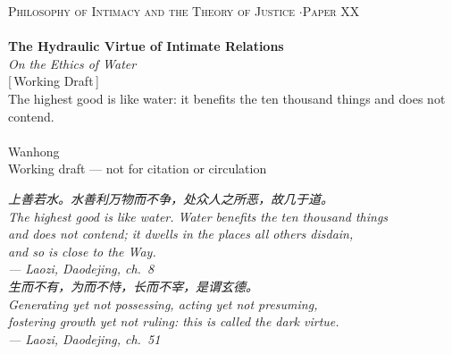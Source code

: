 \documentclass[11pt,a4paper]{article}
\begin{document}
\thispagestyle{empty}
\begin{center}
\vspace*{2cm}
{\footnotesize\color{rosedeep}\scshape Philosophy of Intimacy and the Theory of Justice \quad$\cdot$\quad Paper XX}\\[0.3cm]
\coverrule\\[1.2cm]
{\LARGE\bfseries\color{warnred} The Hydraulic Virtue of Intimate Relations}\\[0.5cm]
{\large\itshape\color{warnred} On the Ethics of Water}\\[0.8cm]
{\small\color{gold} [\,Working Draft\,]}\\[0.8cm]
{\normalsize\color{inksoft} The highest good is like water: it benefits the ten thousand things and does not contend.}\\[2cm]
\coverrule[0.25]\\[0.6cm]
{\normalsize\color{inksoft} Wanhong}\\
\vfill
{\footnotesize\color{gold} Working draft --- not for citation or circulation}
\coverfootnote
\end{center}
\newpage

\thispagestyle{empty}
\vspace*{2.2cm}
\begin{center}
\begin{minipage}{0.76\linewidth}
\centering\itshape\color{rose}
{\cjk 上善若水。水善利万物而不争，处众人之所恶，故几于道。}\\[0.3em]
The highest good is like water. Water benefits the ten thousand things\\[0.15em]
and does not contend; it dwells in the places all others disdain,\\[0.15em]
and so is close to the Way.\\[0.6em]
{\upshape\footnotesize\color{gold} --- Laozi, \emph{Daodejing}, ch.~8}\\[1.4em]
\itshape
{\cjk 生而不有，为而不恃，长而不宰，是谓玄德。}\\[0.3em]
Generating yet not possessing, acting yet not presuming,\\[0.15em]
fostering growth yet not ruling: this is called the dark virtue.\\[0.6em]
{\upshape\footnotesize\color{gold} --- Laozi, \emph{Daodejing}, ch.~51}
\end{minipage}
\end{center}
\newpage
\end{document}
